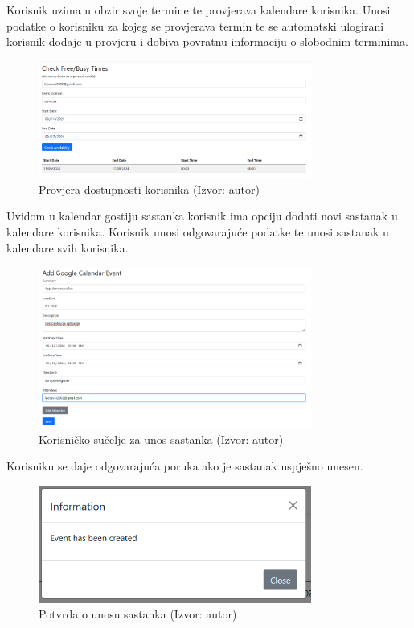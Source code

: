 \documentclass{foi}
\begin{document}
Korisnik uzima u obzir svoje termine te provjerava kalendare korisnika. Unosi podatke o korisniku za kojeg se provjerava termin te se automatski ulogirani korisnik dodaje u provjeru i dobiva povratnu informaciju o slobodnim terminima.
\begin{figure}[H]
    \centering
    \includegraphics[width=0.8\textwidth]{slike/appUsage4.png}
    \caption{Provjera dostupnosti korisnika (Izvor: autor)}
    \label{fig:createEventForAllUsers}
\end{figure}
Uvidom u kalendar gostiju sastanka korisnik ima opciju dodati novi sastanak u kalendare korisnika. Korisnik unosi odgovarajuće podatke te unosi sastanak u kalendare svih korisnika.
\begin{figure}[H]
    \centering
    \includegraphics[width=0.8\textwidth]{slike/appUsage5.png}
    \caption{Korisničko sučelje za unos sastanka (Izvor: autor)}
    \label{fig:InputMEetingUI}
\end{figure}
Korisniku se daje odgovarajuća poruka ako je sastanak uspješno unesen.
\begin{figure}[H]
    \centering
    \includegraphics[width=0.8\textwidth]{slike/appUsage6.png}
    \caption{Potvrda o unosu sastanka (Izvor: autor)}
    \label{fig:meetingconfirmPOpUp}
\end{figure}
\end{document}
